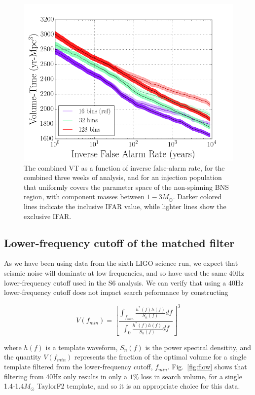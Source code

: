 \begin{figure}
\centering
\includegraphics[width=1.0\textwidth]{papers/bns_o1_dev/figures/chisq_combined.png}
\caption{\label{fig:fchisq} 
The combined VT as a function of inverse false-alarm rate, for the combined three weeks of analysis, and for an injection population that uniformly covers the parameter space of the non-spinning BNS region, with component masses between $1- 3M_\odot$. Darker colored lines indicate the inclusive IFAR value, while lighter lines show the exclusive IFAR. 
}
\end{figure}

\subsection{Lower-frequency cutoff of the matched filter}

As we have been using data from the sixth LIGO science run, we expect that seismic noise will dominate at low frequencies, and so have used the same 40Hz lower-frequency cutoff used in the S6 analysis. We can verify that using a 40Hz lower-frequency cutoff does not impact search peformance by constructing

\begin{equation}
V(f_{min}) = \left[ \frac{\int_{f_{min}} \frac{h^{*}(f)h(f)}{S_n(f)} df}{\int_{0} \frac{h^*(f)h(f)}{S_n(f)} df} \right]^3
\end{equation}

where $h(f)$ is a template waveform, $S_n(f)$ is the power spectral densitity, and the quantity $V(f_{min})$ represents the fraction of the optimal volume for a single template
filtered from the lower-frequency cutoff, $f_{min}$. Fig.~\ref{fig:flow} shows that filtering from 40Hz only results in only a $1\%$ loss in search volume, for a single 1.4-1.4$M_\odot$ TaylorF2 template, and so it is an appropriate choice for this data.

